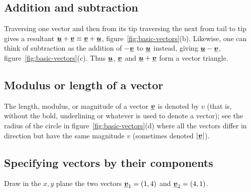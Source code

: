 \subsection*{Addition and subtraction}
Traversing one vector and then from its tip traversing the next from tail to tip gives a resultant $\mathit{\underline{\boldsymbol{u}}} + \mathit{\underline{\boldsymbol{v}}} \equiv \mathit{\underline{\boldsymbol{v}}} + \mathit{\underline{\boldsymbol{u}}}$, figure~\ref{fig:basic-vectors}(b).  Likewise, one can think of subtraction as the addition of $-\mathit{\underline{\boldsymbol{v}}}$ to $\mathit{\underline{\boldsymbol{u}}}$ instead, giving $\mathit{\underline{\boldsymbol{u}}} - \mathit{\underline{\boldsymbol{v}}}$, figure~\ref{fig:basic-vectors}(c).  Thus $\mathit{\underline{\boldsymbol{u}}}$, $\mathit{\underline{\boldsymbol{v}}}$ and $\mathit{\underline{\boldsymbol{u}}} + \mathit{\underline{\boldsymbol{v}}}$ form a vector triangle.

\subsection*{Modulus or length of a vector}
The length, modulus, or magnitude of a vector $\mathit{\underline{\boldsymbol{v}}}$ is denoted by $v$ (that is, without the bold, underlining or whatever is used to denote a vector); see the radius of the circle in figure~\ref{fig:basic-vectors}(d) where all the vectors differ in direction but have the same magnitude $v$ (sometimes denoted $|\mathit{\underline{\boldsymbol{v}}}|$).

\subsection*{Specifying vectors by their components}
Draw in the $x,y$ plane the two vectors $\mathit{\underline{\boldsymbol{v}}}_1 = (1,4)$ and $\mathit{\underline{\boldsymbol{v}}}_2 = (4,1)$.



